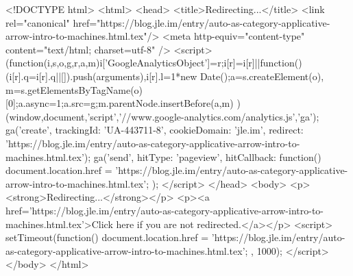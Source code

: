 <!DOCTYPE html>
<html>
<head>
<title>Redirecting...</title>
<link rel="canonical" href="https://blog.jle.im/entry/auto-as-category-applicative-arrow-intro-to-machines.html.tex"/>
<meta http-equiv="content-type" content="text/html; charset=utf-8" />
<script>
(function(i,s,o,g,r,a,m){i['GoogleAnalyticsObject']=r;i[r]=i[r]||function(){
(i[r].q=i[r].q||[]).push(arguments)},i[r].l=1*new Date();a=s.createElement(o),
m=s.getElementsByTagName(o)[0];a.async=1;a.src=g;m.parentNode.insertBefore(a,m)
})(window,document,'script','//www.google-analytics.com/analytics.js','ga');
ga('create', { trackingId: 'UA-443711-8', cookieDomain: 'jle.im', redirect: 'https://blog.jle.im/entry/auto-as-category-applicative-arrow-intro-to-machines.html.tex'});
ga('send', { hitType: 'pageview', hitCallback: function() { document.location.href = 'https://blog.jle.im/entry/auto-as-category-applicative-arrow-intro-to-machines.html.tex'; } });
</script>
</head>
<body>
  <p><strong>Redirecting...</strong></p>
  <p><a href='https://blog.jle.im/entry/auto-as-category-applicative-arrow-intro-to-machines.html.tex'>Click here if you are not redirected.</a></p>
  <script>
    setTimeout(function() { document.location.href = 'https://blog.jle.im/entry/auto-as-category-applicative-arrow-intro-to-machines.html.tex'; }, 1000);
  </script>
</body>
</html>
